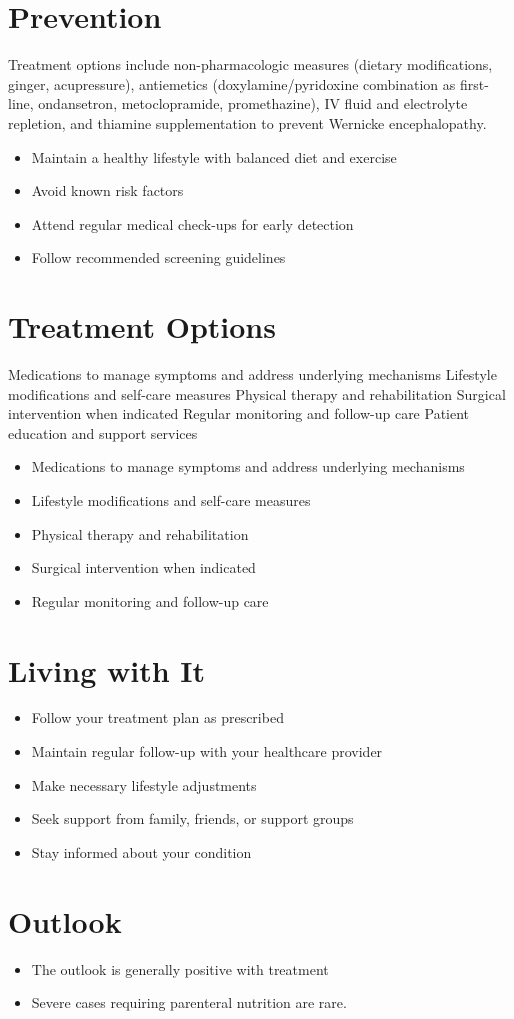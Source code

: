 \section{Prevention}
Treatment options include non-pharmacologic measures (dietary modifications, ginger, acupressure), antiemetics (doxylamine/pyridoxine combination as first-line, ondansetron, metoclopramide, promethazine), IV fluid and electrolyte repletion, and thiamine supplementation to prevent Wernicke encephalopathy.

\begin{itemize}[noitemsep]
  \item Maintain a healthy lifestyle with balanced diet and exercise
  \item Avoid known risk factors
  \item Attend regular medical check-ups for early detection
  \item Follow recommended screening guidelines
\end{itemize}
\section{Treatment Options}
Medications to manage symptoms and address underlying mechanisms Lifestyle modifications and self-care measures Physical therapy and rehabilitation Surgical intervention when indicated Regular monitoring and follow-up care Patient education and support services

\begin{itemize}[noitemsep]
  \item Medications to manage symptoms and address underlying mechanisms
  \item Lifestyle modifications and self-care measures
  \item Physical therapy and rehabilitation
  \item Surgical intervention when indicated
  \item Regular monitoring and follow-up care
\end{itemize}
\section{Living with It}
\begin{itemize}[noitemsep]
  \item Follow your treatment plan as prescribed
  \item Maintain regular follow-up with your healthcare provider
  \item Make necessary lifestyle adjustments
  \item Seek support from family, friends, or support groups
  \item Stay informed about your condition
\end{itemize}
\section{Outlook}
\begin{itemize}[noitemsep]
  \item The outlook is generally positive with treatment
  \item Severe cases requiring parenteral nutrition are rare.
\end{itemize}
